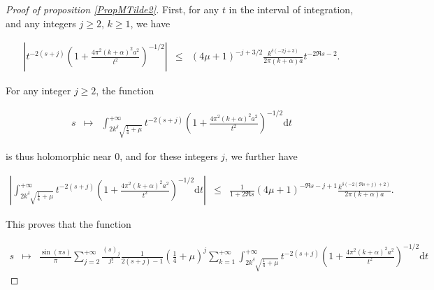 \documentclass{jams-l}
\theoremstyle{definition}
\theoremstyle{remark}
\numberwithin{equation}{section}
\begin{document}
\begin{proof}[Proof of proposition \ref{PropMTilde2}]
                    \noindent First, for any $t$ in the interval of integration, and any integers $j \geqslant 2$, $k \geqslant 1$, we have
                    
                    \[ \begin{array}{lll}
                            \scriptstyle \left \vert t^{-2 \left( s + j \right)} \left( 1 + \frac{4 \pi^2 \left( k + \alpha \right)^2 a^2}{t^2} \right)^{-1/2} \right \vert  & \scriptstyle \leqslant & \scriptstyle \left( 4 \mu + 1 \right)^{-j + 3/2} \frac{k^{\delta \left( -2j + 3 \right)}}{2 \pi \left( k + \alpha \right) a} t^{- 2 \Re s - 2}.
                        \end{array} \]
                    
                    \noindent For any integer $j \geqslant 2$, the function
                    
                    \[ \begin{array}{lll}
                            s & \longmapsto & \int_{2 k^{\delta} \sqrt{\frac{1}{4} + \mu}}^{+ \infty} t^{- 2 \left( s + j \right)} \left( 1 + \frac{4 \pi^2 \left( k + \alpha \right)^2 a^2}{t^2} \right)^{-1/2} \mathrm{d}t
                        \end{array} \]
                    
                    \noindent is thus holomorphic near $0$, and for these integers $j$, we further have
                    
                    \[ \begin{array}{lll}
                            \scriptstyle \left \vert \int_{2 k^{\delta} \sqrt{\frac{1}{4} + \mu}}^{+ \infty} t^{- 2 \left( s + j \right)} \left( 1 + \frac{4 \pi^2 \left( k + \alpha \right)^2 a^2}{t^2} \right)^{-1/2} \mathrm{d}t \right \vert & \scriptstyle \leqslant & \scriptstyle \frac{1}{1 + 2 \Re s} \left( 4 \mu + 1 \right)^{-\Re s -j+1} \frac{k^{\delta \left( -2 \left( \Re s + j \right)  + 2 \right)}}{2 \pi \left( k + \alpha \right) a}.
                        \end{array} \]
                    
                    \noindent This proves that the function
                    
                    \[ \begin{array}{lll}
                            \scriptstyle s & \scriptstyle \longmapsto & \scriptstyle \frac{\sin \left( \pi s \right)}{\pi} \sum\limits_{j = 2}^{+\infty} \frac{\left( s \right)_j}{j!} \frac{1}{2 \left( s + j \right) - 1} \left( \frac{1}{4} + \mu \right)^j \sum\limits_{k = 1}^{+\infty} \int_{2 k^{\delta} \sqrt{\frac{1}{4} + \mu}}^{+ \infty} t^{- 2 \left( s + j \right)} \left( 1 + \frac{4 \pi^2 \left( k + \alpha \right)^2 a^2}{t^2} \right)^{-1/2} \mathrm{d}t
                        \end{array} \]
                    

\end{proof}
\end{document}
